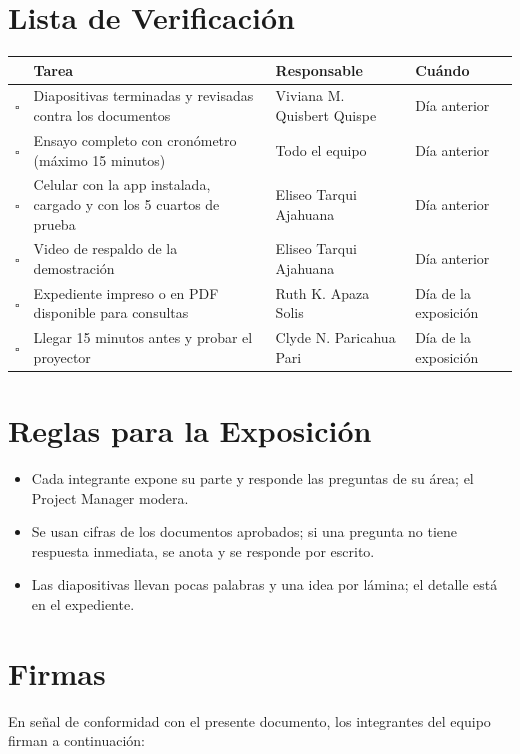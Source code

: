 \documentclass[11pt,a4paper]{article}
\begin{document}
\section{Lista de Verificación}
{\small
{}
\noindent\begin{tabularx}{\textwidth}{@{}C{0.8cm} L P{3.0cm} C{1.8cm}@{}}
\toprule
{}
\textbf{} & \textbf{Tarea} & \textbf{Responsable} & \textbf{Cuándo} \\
\midrule
$\square$ & Diapositivas terminadas y revisadas contra los documentos & Viviana M. Quisbert Quispe & Día anterior \\
$\square$ & Ensayo completo con cronómetro (máximo 15 minutos) & Todo el equipo & Día anterior \\
$\square$ & Celular con la app instalada, cargado y con los 5 cuartos de prueba & Eliseo Tarqui Ajahuana & Día anterior \\
$\square$ & Video de respaldo de la demostración & Eliseo Tarqui Ajahuana & Día anterior \\
$\square$ & Expediente impreso o en PDF disponible para consultas & Ruth K. Apaza Solis & Día de la exposición \\
$\square$ & Llegar 15 minutos antes y probar el proyector & Clyde N. Paricahua Pari & Día de la exposición \\
\bottomrule
\end{tabularx}
}

\section{Reglas para la Exposición}
\begin{itemize}[leftmargin=*]
    \item Cada integrante expone su parte y responde las preguntas de su área; el Project Manager modera.
    \item Se usan cifras de los documentos aprobados; si una pregunta no tiene respuesta inmediata, se anota y se responde por escrito.
    \item Las diapositivas llevan pocas palabras y una idea por lámina; el detalle está en el expediente.
\end{itemize}

\section{Firmas}
\noindent En señal de conformidad con el presente documento, los integrantes del equipo firman a continuación:
\end{document}
